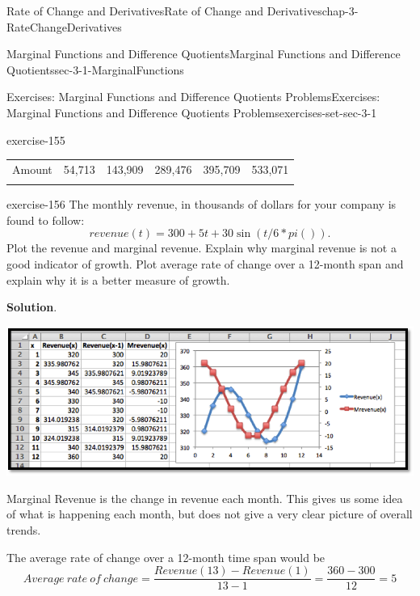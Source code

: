 \documentclass[oneside,10pt,]{book}
\numberwithin{equation}{section}
\newcommand{\hrulethin}  {\noalign{\hrule height 0.04em}}
\begin{document}
\begin{chapterptx}{Rate of Change and Derivatives}{}{Rate of Change and Derivatives}{}{}{chap-3-RateChangeDerivatives}
\begin{sectionptx}{Marginal Functions and Difference Quotients}{}{Marginal Functions and Difference Quotients}{}{}{sec-3-1-MarginalFunctions}
\begin{exercises-subsection-numberless}{Exercises: Marginal Functions and Difference Quotients Problems}{}{Exercises: Marginal Functions and Difference Quotients Problems}{}{}{exercises-set-sec-3-1}
\begin{exercisegroup}
\begin{divisionexerciseeg}{16}{}{}{exercise-155}
\begin{sidebyside}{1}{0}{0}{0}
\begin{sbspanel}{1}
{\begin{tabular}{cccccc}
Amount&\textdollar{}54,713&\textdollar{}143,909&\textdollar{}289,476&\textdollar{}395,709&\textdollar{}533,071\tabularnewline\hrulethin
\end{tabular}
\par}
\end{sbspanel}%
\end{sidebyside}%
\end{divisionexerciseeg}%
\end{exercisegroup}
\par\medskip\noindent
\begin{divisionexercise}{17}{}{}{exercise-156}%
\hypertarget{p-1007}{}%
The monthly revenue, in thousands of dollars for your company is found to follow:%
%
\begin{equation*}
revenue(t)=300+5t+30 \sin(t/6*pi()).
\end{equation*}
\hypertarget{p-1008}{}%
Plot the revenue and marginal revenue.  Explain why marginal revenue is not a good indicator of growth.  Plot average rate of change over a 12-month span and explain why it is a better measure of growth.%
\par\smallskip%
\noindent\textbf{Solution}.\hypertarget{solution-76}{}\quad%
\leavevmode%
\begin{sidebyside}{1}{0.05}{0.05}{0}%
\begin{sbspanel}{0.9}%
\includegraphics[width=1\linewidth]{images/sec3-1-sol17a.png}
\end{sbspanel}%
\end{sidebyside}%
\par
\hypertarget{p-1009}{}%
Marginal Revenue is the change in revenue each month. This gives us some idea of what is happening each month, but does not give a very clear picture of overall trends.%
\par
\hypertarget{p-1010}{}%
The average rate of change over a 12-month time span would be%
\begin{equation*}
Average\ rate\ of\ change=  \frac{Revenue(13)-Revenue(1)}{13-1}=\frac{360-300}{12}=5
\end{equation*}

\end{divisionexercise}
\end{exercises-subsection-numberless}
\end{sectionptx}
\end{chapterptx}
\end{document}
